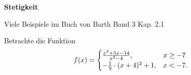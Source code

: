 \documentclass[11pt]{exam}
\newcommand{\theme}{Stetigkeit}
\begin{document}
	\fontsize{14}{14}\selectfont
	\begin{center}
		\huge\bf\theme
	\end{center}

	\begin{questions}
\question[2]
Viele Beispiele im Buch von Barth Band 3 Kap. 2.1


\noaddpoints
\question[\totalpoints]
\addpoints
Betrachte die Funktion \[f(x)=\begin{cases}\frac{x^2+5x-14}{x^2-4},&x\geq -7\\ -\frac{1}{9}\cdot(x+4)^2+1,&x<-7.\end{cases}\]



\end{questions}
\end{document}
